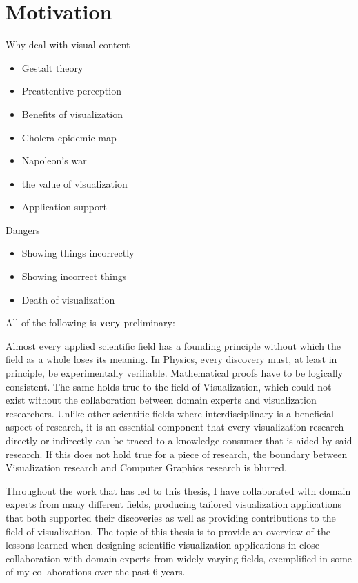 \chapter{Motivation}
\label{cha:motivation}

Why deal with visual content
\begin{itemize}
\item Gestalt theory
\item Preattentive perception
\item Benefits of visualization
\item \cite{tufte1991envisioning} Cholera epidemic map
\item Napoleon's war
\item \cite{van2005value} the value of visualization
\item Application support
\end{itemize}

Dangers
\begin{itemize}
\item Showing things incorrectly
\item Showing incorrect things
\item \cite{lorensen2004death} Death of visualization

\end{itemize}

All of the following is \textbf{very} preliminary:


 Almost every applied scientific field has a founding principle without which the field as a whole loses its meaning. In Physics, every discovery must, at least in principle, be experimentally verifiable. Mathematical proofs have to be logically consistent. The same holds true to the field of Visualization, which could not exist without the collaboration between domain experts and visualization researchers. Unlike other scientific fields where interdisciplinary is a beneficial aspect of research, it is an essential component that every visualization research directly or indirectly can be traced to a knowledge consumer that is aided by said research. If this does not hold true for a piece of research, the boundary between Visualization research and Computer Graphics research is blurred.

Throughout the work that has led to this thesis, I have collaborated with domain experts from many different fields, producing tailored visualization applications that both supported their discoveries as well as providing contributions to the field of visualization. The topic of this thesis is to provide an overview of the lessons learned when designing scientific visualization applications in close collaboration with domain experts from widely varying fields, exemplified in some of my collaborations over the past 6 years.

